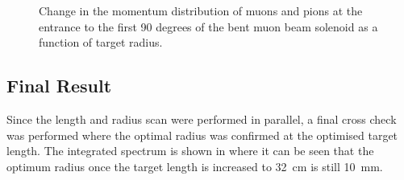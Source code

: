\begin{figure}[t]
\centering
{}
\caption{
Change in the momentum distribution of muons and pions at the entrance to the first 90 degrees of the bent muon beam solenoid as a function of target radius.
}
\end{figure}

\subsection{Final Result}
Since the length and radius scan were performed in parallel, a final cross check was performed where the optimal radius was confirmed at the optimised target length.
The integrated spectrum is shown in  where it can be seen that the optimum radius once the target length is increased to 32~cm is still 10~mm.

